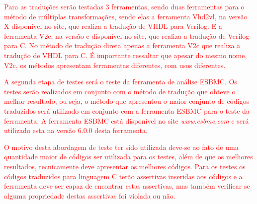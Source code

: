 \par
\textcolor{red}{Para as traduções serão testadas 3 ferramentas, sendo duas ferramentas para o método de múltiplas transformações, sendo elas a ferramenta Vhd2vl, na versão X disponível no site, que realiza a tradução de VHDL para Verilog. E a ferramenta V2c, na versão e disponível no site, que realiza a tradução de Verilog para C. No método de tradução direta apenas a ferramenta V2c que realiza a tradução de VHDL para C. É importante ressaltar que apesar do mesmo nome, V2c, os métodos apresentam ferramentas diferentes, com usos diferentes.}

\par
\textcolor{red}{A segunda etapa de testes será o teste da ferramenta de análise ESBMC. Os testes serão realizados em conjunto com o método de tradução que obteve o melhor resultado, ou seja, o método que apresentou o maior conjunto de códigos traduzidos será utilizado em conjunto com a ferramenta ESBMC para o teste da ferramenta. A ferramenta ESBMC está disponível no site \textit{www.esbmc.com} e será utilizado esta na versão 6.0.0 desta ferramenta.}

\par
\textcolor{red}{O motivo desta abordagem de teste ter sido utilizada deve-se ao fato de uma quantidade maior de códigos ser utilizada para os testes, além de que os melhores resultados, tecnicamente deve apresentar os melhores códigos. Para os testes os códigos traduzidos para linguagem C terão assertivas inseridas aos códigos e a ferramenta deve ser capaz de encontrar estas assertivas, mas também verificar se alguma propriedade destas assertivas foi violada ou não.}
\par 

\par 

